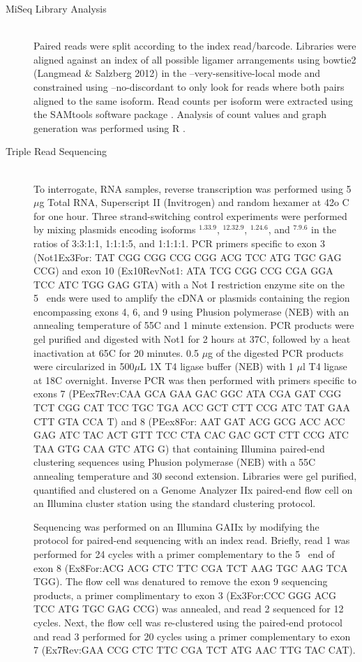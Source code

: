 {\begin{description}
		\item[MiSeq Library Analysis] \hfill \\
		Paired reads were split according to the index read/barcode. Libraries were aligned against an index of all possible \dscam{} ligamer arrangements using bowtie2 (Langmead \& Salzberg 2012) in the –very-sensitive-local mode and constrained using –no-discordant to only look for reads where both pairs aligned to the same isoform. Read counts per isoform were extracted using the SAMtools software package \citep{Li2009d}. Analysis of count values and graph generation was performed using R \citep{RDevelopmentCoreTeam2011}.
		
		\item[Triple Read Sequencing] \hfill \\
		To interrogate, RNA samples, reverse transcription was performed using 5 $\mu$g Total RNA, Superscript II (Invitrogen) and random hexamer at 42o C for one hour. Three strand-switching control experiments were performed by mixing plasmids encoding isoforms \dscam{}$^{1.33.9}$, \dscam{}$^{12.32.9}$, \dscam{}$^{1.24.6}$, and \dscam{}$^{7.9.6}$ in the ratios of 3:3:1:1, 1:1:1:5, and 1:1:1:1. PCR primers specific to exon 3 (Not1Ex3For: TAT CGG CGG CCG CGG ACG TCC ATG TGC GAG CCG) and exon 10 (Ex10RevNot1: ATA TCG CGG CCG CGA GGA TCC ATC TGG GAG GTA) with a Not I restriction enzyme site on the 5\textprime~ ends were used to amplify the cDNA or plasmids containing the region encompassing exons 4, 6, and 9 using Phusion polymerase (NEB) with an annealing temperature of 55\degree C and 1 minute extension. PCR products were gel purified and digested with Not1 for 2 hours at 37\degree C, followed by a heat inactivation at 65\degree C for 20 minutes. 0.5 $\mu$g of the digested PCR products were circularized in 500$\mu$L 1X T4 ligase buffer (NEB) with 1 $\mu$l T4 ligase at 18\degree C overnight. Inverse PCR was then performed with primers specific to exons 7 (PEex7Rev:CAA GCA GAA GAC GGC ATA CGA GAT CGG TCT CGG CAT TCC TGC TGA ACC GCT CTT CCG ATC TAT GAA CTT GTA CCA T) and 8 (PEex8For: AAT GAT ACG GCG ACC ACC GAG ATC TAC ACT GTT TCC CTA CAC GAC GCT CTT CCG ATC TAA GTG CAA GTC ATG G) that containing Illumina paired-end clustering sequences using Phusion polymerase (NEB) with a 55\degree C annealing temperature and 30 second extension. Libraries were gel purified, quantified and clustered on a Genome Analyzer IIx paired-end flow cell on an Illumina cluster station using the standard clustering protocol.

		Sequencing was performed on an Illumina GAIIx by modifying the protocol for paired-end sequencing with an index read. Briefly, read 1 was performed for 24 cycles with a primer complementary to the 5\textprime~ end of exon 8 (Ex8For:ACG ACG CTC TTC CGA TCT AAG TGC AAG TCA TGG). The flow cell was denatured to remove the exon 9 sequencing products, a primer complimentary to exon 3 (Ex3For:CCC GGG ACG TCC ATG TGC GAG CCG) was annealed, and read 2 sequenced for 12 cycles. Next, the flow cell was re-clustered using the paired-end protocol and read 3 performed for 20 cycles using a primer complementary to exon 7 (Ex7Rev:GAA CCG CTC TTC CGA TCT ATG AAC TTG TAC CAT).


\end{description}}
